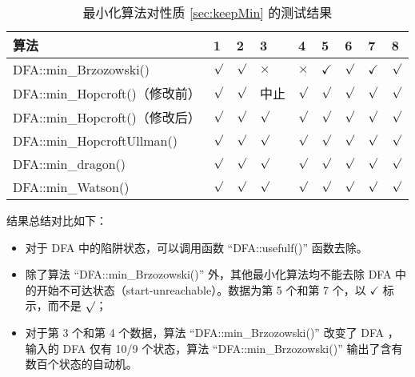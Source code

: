 \begin{table}[!htbp]
    \caption{ 最小化算法对性质 \ref{sec:keepMin} 的测试结果 }
    \label{tab:KeepMinResult}
    \centering
    \small%
    \setlength{\tabcolsep}{4pt}%
    \renewcommand{\arraystretch}{1.2}%
    \begin{tabular}{l|p{2em}<{\centering} p{2em}<{\centering} p{2em}<{\centering} p{2em}<{\centering} p{2em}<{\centering} p{2em}<{\centering} p{2em}<{\centering} p{2em}<{\centering}}  %
        \toprule %
        算法 & 1 & 2 & 3 & 4 &  5 &  6  & 7 & 8  \\
        \midrule
        DFA::min\_Brzozowski()        & $\surd$ & $\surd$ & $\times$  & $\times$  & $\checkmark$ & $\surd$ & $\checkmark$ & $\surd$ \\
        DFA::min\_Hopcroft()（修改前） & $\surd$ & $\surd$ & 中止    & $\surd$     & $\surd$ & $\surd$ & $\surd$ & $\surd$ \\
        DFA::min\_Hopcroft()（修改后） & $\surd$ & $\surd$ & $\surd$ & $\surd$     & $\surd$ & $\surd$ & $\surd$ & $\surd$ \\
        DFA::min\_HopcroftUllman()    & $\surd$ & $\surd$ & $\surd$ & $\surd$     & $\surd$ & $\surd$ & $\surd$ & $\surd$ \\
        DFA::min\_dragon()            & $\surd$ & $\surd$ & $\surd$ & $\surd$     & $\surd$ & $\surd$ & $\surd$ & $\surd$ \\
        DFA::min\_Watson()            & $\surd$ & $\surd$ & $\surd$ & $\surd$     & $\surd$ & $\surd$ & $\surd$ & $\surd$ \\
        \bottomrule%
    \end{tabular}
\end{table}

结果总结对比如下：
\begin{itemize}
    \item 对于 DFA 中的陷阱状态，可以调用函数 “DFA::usefulf()” 函数去除。
    \item 除了算法 “DFA::min\_Brzozowski()” 外，其他最小化算法均不能去除 DFA 中的开始不可达状态（start-unreachable）。数据为第 5 个和第 7 个，以 $\checkmark$ 标示，而不是 $\surd$；
    \item 对于第 3 个和第 4 个数据，算法 “DFA::min\_Brzozowski()” 改变了 DFA ，输入的 DFA 仅有 10/9 个状态，算法 “DFA::min\_Brzozowski()” 输出了含有数百个状态的自动机。
\end{itemize}


